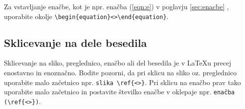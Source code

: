 Za vstavljanje enačbe, kot je npr. enačba (\ref{eqn:e}) v poglavju \ref{sec:enacbe} , uporabite okolje \verb|\begin{equation}<>\end{equation}|.

\subsection{Sklicevanje na dele besedila}\label{sec:sklici}

Sklicevanje na sliko, preglednico, enačbo ali del besedila je v \LaTeX u precej enostavno in enoznačno. Bodite pozorni, da pri sklicu na sliko oz. preglednico uporabite malo začetnico npr. \verb|slika \ref{<>}|. Pri sklicu na enačbo prav tako uporabite malo začetnico in postavite številko enačbe v oklepaje npr. \verb|enačba (\ref{<>})|.









